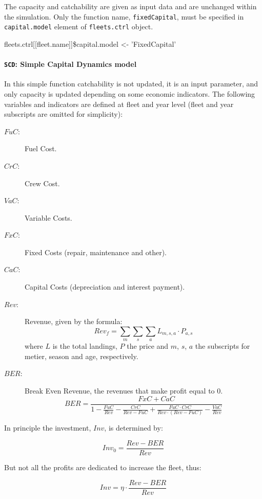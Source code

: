 The capacity and catchability are given as input data and are unchanged within the simulation.
Only the function name, \texttt{fixedCapital},  must be specified in  \texttt{capital.model} element of \texttt{fleets.ctrl}
object.

\begin{Sinput}
  fleets.ctrl[[fleet.name]]\$capital.model <- 'FixedCapital'
\end{Sinput}


\paragraph{\texttt{SCD}: Simple Capital Dynamics model} \hspace{0pt} \smallskip

In this simple function catchability is not updated, it is an input parameter, and only
capacity is updated depending on some economic indicators. The following variables and indicators are defined
at fleet and year level (fleet and year subscripts are omitted for simplicity):

\begin{description}
	\item[$FuC$:] Fuel Cost.
	\item[$CrC$:] Crew Cost.
	\item[$VaC$:] Variable Costs.
	\item[$FxC$:] Fixed Costs (repair, maintenance and other).
	\item[$CaC$:] Capital Costs (depreciation and interest payment).
	\item[$Rev$:] Revenue, given by the formula:
		$$Rev_f = \sum_m\sum_s\sum_a L_{m,s,a}\cdot P_{a,s}$$
    \noindent where $L$ is the total landings, $P$ the price and $m$, $s$, $a$ the subscripts for metier, season and age, respectively.
	\item[$BER$:] Break Even Revenue, the revenues that make profit equal to 0.
		$$BER = \frac{FxC+CaC}{1-\frac{FuC}{Rev} - \frac{CrC}{Rev-FuC} + \frac{FuC\cdot CrC}{Rev \cdot (Rev-FuC)} - \frac{VaC}{Rev}}$$
\end{description}

In principle the investment, $Inv$, is determined by:

	$$Inv_0 = \frac{Rev-BER}{Rev}$$

But not all the profits are dedicated to increase the fleet, thus:

	$$Inv = \eta \cdot \frac{Rev-BER}{Rev}$$
	
